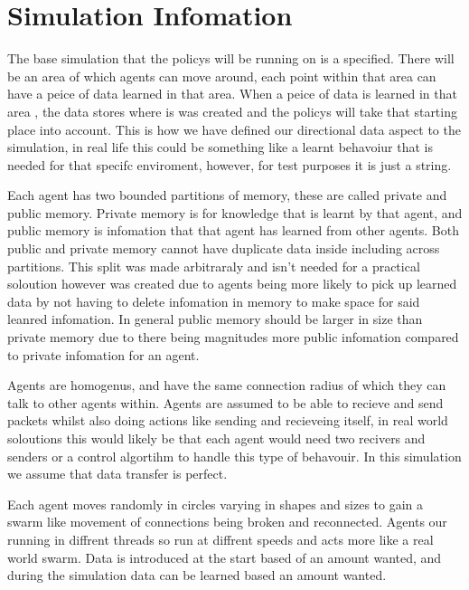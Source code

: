 \documentclass{UoYCSproject}
\begin{document}
\section{Simulation Infomation}
\label{sec:Sim Info}

The base simulation that the policys will be running on is a specified.
There will be an area of which agents can move around, each point within that area can have a peice of data learned in that area.
When a peice of data is learned in that area , the data stores where is was created and the policys will take that starting place into account.
This is how we have defined our directional data aspect to the simulation, in real life this could be something like a learnt behavoiur that is needed for that specifc enviroment, however, for test purposes it is just a string.

Each agent has two bounded partitions of memory, these are called private and public memory.
Private memory is for knowledge that is learnt by that agent, and public memory is infomation that that agent has learned from other agents.
Both public and private memory cannot have duplicate data inside including across partitions.
This split was made arbitraraly and isn't needed for a practical soloution however was created due to agents being more likely to pick up learned data by not having to delete infomation in memory to make space for said leanred infomation.
In general public memory should be larger in size than private memory due to there being magnitudes more public infomation compared to private infomation for an agent.

Agents are homogenus, and have the same connection radius of which they can talk to other agents within.
Agents are assumed to be able to recieve and send packets whilst also doing actions like sending and recieveing itself, in real world soloutions this would likely be that each agent would need two recivers and senders or a control algortihm to handle this type of behavouir.
In this simulation we assume that data transfer is perfect.

Each agent moves randomly in circles varying in shapes and sizes to gain a swarm like movement of connections being broken and reconnected.
Agents our running in diffrent threads so run at diffrent speeds and acts more like a real world swarm.
Data is introduced at the start based of an amount wanted, and during the simulation data can be learned based an amount wanted.
\end{document}
